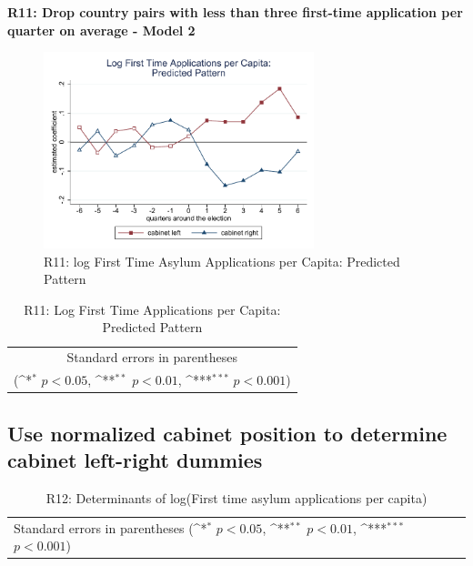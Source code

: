 \documentclass[10pt,a4paper]{scrartcl}
\begin{document}
\clearpage
\textbf{R11: Drop country pairs with less than three first-time application per quarter on average - Model 2}
\begin{figure}[!ht]
	\centering
	\includegraphics[width=0.7\textwidth]{figures_edited/app_graph2_R11.pdf}
	\caption{R11: log First Time Asylum Applications per Capita: Predicted Pattern}
\end{figure}

\begin{table}[!ht]\centering
	\footnotesize
	\renewcommand{\arraystretch}{1.2}
	\def\sym#1{\ifmmode^{#1}\else\(^{#1}\)\fi}
	\caption{R11: Log First Time Applications per Capita: Predicted Pattern}
	\begin{tabular}{l*{2}{c}}
		\hline\hline
		
		\hline\hline
		\multicolumn{3}{c}{\footnotesize Standard errors in parentheses} \\
		\multicolumn{3}{c}{\footnotesize (\sym{*} \(p<0.05\), \sym{**} \(p<0.01\), \sym{***} \(p<0.001\))} \\
	\end{tabular}
\end{table}





\clearpage
\FloatBarrier
\subsection{Use normalized cabinet position to determine cabinet left-right dummies}
\begin{table}[!ht]\centering
	\renewcommand{\arraystretch}{1.25}
	\small
	\def\sym#1{\ifmmode^{#1}\else\(^{#1}\)\fi}
	\caption{R12: Determinants of log(First time asylum applications per capita)}
	\begin{tabular}{l*{3}{c}}
		\hline\hline
		
		\hline\hline
		\multicolumn{4}{l}{\footnotesize Standard errors in parentheses (\sym{*} \(p<0.05\), \sym{**} \(p<0.01\), \sym{***} \(p<0.001\))}\\
	\end{tabular}
\end{table}
\end{document}
